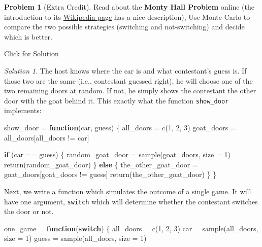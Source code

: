 \documentclass[
]{book}
\newenvironment{Shaded}{\begin{snugshade}}{\end{snugshade}}
\newcommand{\AttributeTok}[1]{\textcolor[rgb]{0.77,0.63,0.00}{#1}}
\newcommand{\ControlFlowTok}[1]{\textcolor[rgb]{0.13,0.29,0.53}{\textbf{#1}}}
\newcommand{\DecValTok}[1]{\textcolor[rgb]{0.00,0.00,0.81}{#1}}
\newcommand{\FunctionTok}[1]{\textcolor[rgb]{0.00,0.00,0.00}{#1}}
\newcommand{\NormalTok}[1]{#1}
\newcommand{\OtherTok}[1]{\textcolor[rgb]{0.56,0.35,0.01}{#1}}
\newcommand{\SpecialCharTok}[1]{\textcolor[rgb]{0.00,0.00,0.00}{#1}}
\theoremstyle{definition}
\theoremstyle{definition}
\theoremstyle{definition}
\newtheorem{exercise}{Problem}[chapter]
\theoremstyle{definition}
\theoremstyle{remark}
\newtheorem*{solution}{Solution}
\begin{document}
\begin{exercise}[Extra Credit]
Read about the \textbf{Monty Hall Problem} online (the introduction to its
\href{https://en.wikipedia.org/wiki/Monty_Hall_problem}{Wikipedia page} has a nice description),
Use Monte Carlo to compare the two possible strategies (switching and
not-switching) and decide which is better.
\end{exercise}

Click for Solution

\begin{solution}
The host knows where the car is and what contestant's guess is. If those two are the same (i.e., contestant guessed right), he will choose one of the two remaining doors at random. If not, he simply shows the contestant the other door with the goat behind it. This exactly what the function \texttt{show\_door} implements:

\begin{Shaded}
\begin{Highlighting}[]
\NormalTok{show\_door }\OtherTok{=} \ControlFlowTok{function}\NormalTok{(car, guess) \{}
\NormalTok{    all\_doors }\OtherTok{=} \FunctionTok{c}\NormalTok{(}\DecValTok{1}\NormalTok{, }\DecValTok{2}\NormalTok{, }\DecValTok{3}\NormalTok{)}
\NormalTok{    goat\_doors }\OtherTok{=}\NormalTok{ all\_doors[all\_doors }\SpecialCharTok{!=}\NormalTok{ car]}

    \ControlFlowTok{if}\NormalTok{ (car }\SpecialCharTok{==}\NormalTok{ guess) \{}
\NormalTok{        random\_goat\_door }\OtherTok{=} \FunctionTok{sample}\NormalTok{(goat\_doors, }\AttributeTok{size =} \DecValTok{1}\NormalTok{)}
        \FunctionTok{return}\NormalTok{(random\_goat\_door)}
\NormalTok{    \} }\ControlFlowTok{else}\NormalTok{ \{}
\NormalTok{        the\_other\_goat\_door }\OtherTok{=}\NormalTok{ goat\_doors[goat\_doors }\SpecialCharTok{!=}\NormalTok{ guess]}
        \FunctionTok{return}\NormalTok{(the\_other\_goat\_door)}
\NormalTok{    \}}
\NormalTok{\}}
\end{Highlighting}
\end{Shaded}

Next, we write a function which simulates the outcome of a single game. It will have one argument, \texttt{switch} which will determine whether the contestant switches the door or not.

\begin{Shaded}
\begin{Highlighting}[]
\NormalTok{one\_game }\OtherTok{=} \ControlFlowTok{function}\NormalTok{(}\ControlFlowTok{switch}\NormalTok{) \{}
\NormalTok{    all\_doors }\OtherTok{=} \FunctionTok{c}\NormalTok{(}\DecValTok{1}\NormalTok{, }\DecValTok{2}\NormalTok{, }\DecValTok{3}\NormalTok{)}
\NormalTok{    car }\OtherTok{=} \FunctionTok{sample}\NormalTok{(all\_doors, }\AttributeTok{size =} \DecValTok{1}\NormalTok{)}
\NormalTok{    guess }\OtherTok{=} \FunctionTok{sample}\NormalTok{(all\_doors, }\AttributeTok{size =} \DecValTok{1}\NormalTok{)}


\end{Highlighting}
\end{Shaded}
\end{solution}
\end{document}
